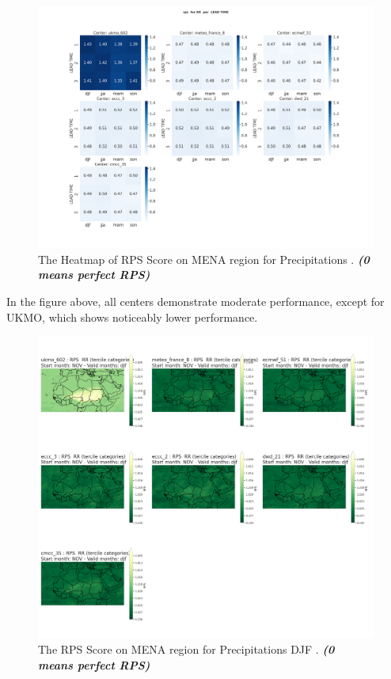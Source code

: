 \begin{figure}[H]
    \centering
    \includegraphics[scale=0.25]{plots/prob/rps/rps_RR.png}
    \caption{The Heatmap of  RPS Score on MENA region for Precipitations    . \textbf{\textit{(0 means perfect RPS)}}}
\end{figure}

In the figure above, all centers demonstrate moderate performance, except for UKMO, which shows noticeably lower performance. 


\begin{figure}[H]
    \centering
    \includegraphics[scale=0.25]{plots/prob/rps/rps_djf_RR.png}
    \caption{The   RPS Score on MENA region for Precipitations DJF   . \textbf{\textit{(0 means perfect RPS)}}}
\end{figure}

